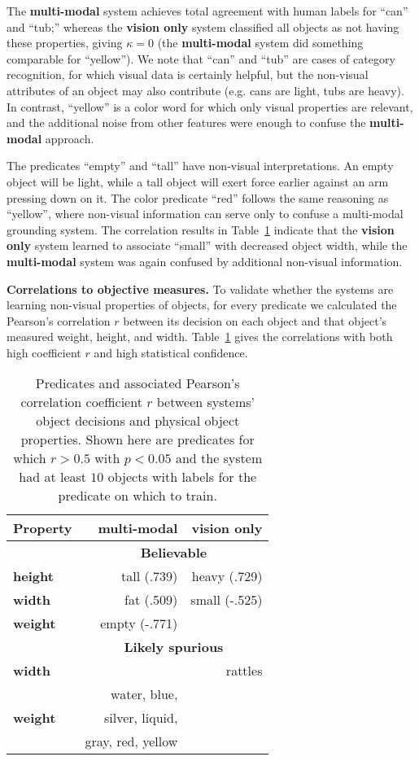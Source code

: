 The \textbf{multi-modal} system achieves total agreement with human labels for ``can'' and ``tub;''
whereas the \textbf{vision only} system classified all objects as not having these properties, giving $\kappa=0$ (the \textbf{multi-modal} system did something comparable for ``yellow'').
We note that ``can'' and ``tub'' are cases of category recognition, for which visual data is certainly helpful, but the non-visual attributes of an object may also contribute (e.g. cans are light, tubs are heavy).
In contrast, ``yellow'' is a color word for which only visual properties are relevant, and the additional noise from other features were enough to confuse the \textbf{multi-modal} approach.

The predicates ``empty'' and ``tall'' have non-visual interpretations.
An empty object will be light, while a tall object will exert force earlier against an arm pressing down on it.
The color predicate ``red'' follows the same reasoning as ``yellow'', where non-visual information can serve only to confuse a multi-modal grounding system.
The correlation results in Table~\ref{tab:predicate_correlations} indicate that the \textbf{vision only} system learned to associate ``small'' with decreased object width, while the \textbf{multi-modal} system was again confused by additional non-visual information.

\textbf{Correlations to objective measures.} To validate whether the systems are learning non-visual properties of objects, for every predicate we calculated the Pearson's correlation $r$ between its decision on each object and that object's measured weight, height, and width. Table~\ref{tab:predicate_correlations} gives the correlations with both high coefficient $r$ and high statistical confidence.

\begin{table}
\centering
\begin{tabular}[h]{|l|r|r|}
	\hline
	\bf Property & \bf multi-modal & \bf vision only \\ \hline \hline
	& \multicolumn{2}{c|}{\bf Believable} \\ \hline
	\bf height & tall (.739) & heavy (.729) \\ \hline
	\bf width & fat (.509) & small (-.525) \\ \hline
	\bf weight & empty (-.771) & \\ \hline \hline
	& \multicolumn{2}{c|}{\bf Likely spurious} \\ \hline
	\bf width & & rattles \\ \hline
	& water, blue, & \\
	\bf weight & silver, liquid, & \\ 
	& gray, red, yellow & \\ \hline
\end{tabular}
\caption{Predicates and associated Pearson's correlation coefficient $r$ between systems' object decisions and physical object properties.
Shown here are predicates for which $r>0.5$ with $p<0.05$ and the system had at least $10$ objects with labels for the predicate on which to train.}
\label{tab:predicate_correlations}
\end{table}

